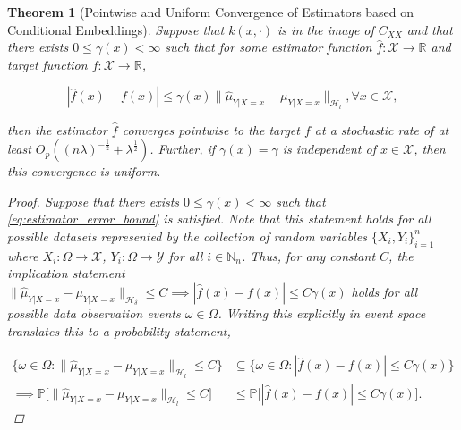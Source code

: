 \documentclass{article}
\newtheorem{theorem}{Theorem}[section]
\begin{document}
	\begin{theorem}[Pointwise and Uniform Convergence of Estimators based on Conditional Embeddings]
		\label{thm:pointwise_uniform_convergence}
		Suppose that $k(x, \cdot)$ is in the image of $C_{XX}$ and that there exists $0 \leq \gamma(x) < \infty$ such that for some estimator function $\hat{f} : \mathcal{X} \to \mathbb{R}$ and target function  $f : \mathcal{X} \to \mathbb{R}$,
		
		\begin{equation}
			| \hat{f}(x) - f(x) | \leq \gamma(x) \big\| \hat{\mu}_{Y | X = x} - \mu_{Y | X = x} \big\|_{\mathcal{H}_{l}}, \forall x \in \mathcal{X},
		\label{eq:estimator_error_bound}
		\end{equation}
		 
		then the estimator $\hat{f}$ converges pointwise to the target $f$ at a stochastic rate of at least $O_{p}((n \lambda)^{-\frac{1}{2}} + \lambda^{\frac{1}{2}})$. Further, if $\gamma(x) = \gamma$ is independent of $x \in \mathcal{X}$, then this convergence is uniform.
		
		\begin{proof}
			
			Suppose that there exists $0 \leq \gamma(x) < \infty$ such that \eqref{eq:estimator_error_bound} is satisfied. Note that this statement holds for all possible datasets represented by the collection of random variables $\{X_{i}, Y_{i}\}_{i = 1}^{n}$ where $X_{i} : \Omega \to \mathcal{X}$,  $Y_{i} : \Omega \to \mathcal{Y}$ for all $i \in \mathbb{N}_{n}$. Thus, for any constant $C$, the implication statement $\big\| \hat{\mu}_{Y | X = x} - \mu_{Y | X = x} \big\|_{\mathcal{H}_{\delta}} \leq C \implies | \hat{f}(x) - f(x) | \leq C \gamma(x)$ holds for all possible data observation events $\omega \in \Omega$. Writing this explicitly in event space translates this to a probability statement,
			
			\begin{equation}
			\begin{aligned}
				\{\omega \in \Omega : \big\| \hat{\mu}_{Y | X = x} - \mu_{Y | X = x} \big\|_{\mathcal{H}_{l}} \leq C\} &\subseteq \{\omega \in \Omega : | \hat{f}(x) - f(x) | \leq C \gamma(x)\} \\
				\implies \mathbb{P}\Big[\big\| \hat{\mu}_{Y | X = x} - \mu_{Y | X = x} \big\|_{\mathcal{H}_{l}} \leq C\Big] &\leq \mathbb{P}\Big[| \hat{f}(x) - f(x) | \leq C \gamma(x) \Big].
			\label{eq:probability_statement}
			\end{aligned}
			\end{equation}
			

\end{proof}
\end{theorem}
\end{document}
